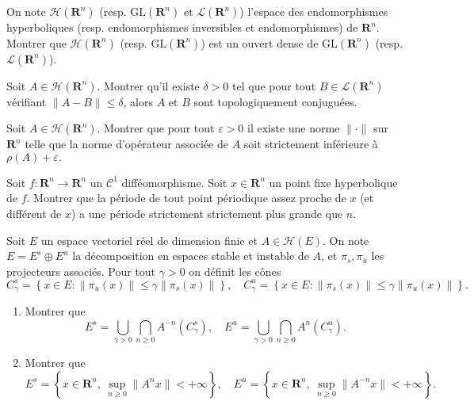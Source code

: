 \documentclass[a4paper,10pt,openany]{article}
\theoremstyle{plain}
\theoremstyle{definition}
\newcommand{\R}{\mathbf{R}}
\begin{document}
 \vspace{1.5mm} 

\noindent On note $\mathcal{H}(\R^n)$ (resp. $\mathrm{GL}(\R^n)$ et $\mathcal{L}(\R^n)$) l'espace des endomorphismes hyperboliques (resp. endomorphismes inversibles et endomorphismes) de $\R^n$. Montrer que $\mathcal{H}(\R^n)$ (resp. $\mathrm{GL}(\R^n)$) est un ouvert dense de $\mathrm{GL}(\R^n)$ (resp. $\mathcal{L}(\R^n)$).

\vspace{0.6cm}

 \vspace{1.5mm} 

\noindent Soit $A \in \mathcal{H}(\R^n)$. Montrer qu'il existe $\delta > 0$ tel que pour tout $B \in \mathcal{L}(\R^n)$ v\'erifiant $\|A-B\| \leq \delta$, alors $A$ et $B$ sont topologiquement conjugu\'ees.

\vspace{0.6cm}

 \vspace{1.5mm} 

\noindent Soit $A \in \mathcal{H}(\R^n)$. Montrer que pour tout $\varepsilon>0$ il existe une norme $\|\cdot\|$ sur $\R^n$ telle que la norme d'op\'erateur associ\'ee de $A$ soit strictement inf\'erieure \`a $\rho(A) + \varepsilon.$
\vspace{0.6cm}

 \vspace{1.5mm} 

\noindent Soit $f : \R^n \to \R^n$ un $\mathcal{C}^1$ diff\'eomorphisme. Soit $x \in \R^n$ un point fixe hyperbolique de $f$. Montrer que la p\'eriode de tout point p\'eriodique assez proche de $x$ (et diff\'erent de $x$) a une p\'eriode strictement strictement plus grande que $n$.
\vspace{0.6cm}

 \vspace{1.5mm} 

\noindent Soit $E$ un espace vectoriel r\'eel de dimension finie et $A \in \mathcal{H}(E)$. On note $E = E^s \oplus E^u$ la d\'ecomposition en espaces stable et instable de $A$, et $\pi_s, \pi_u$ les projecteurs associ\'es. Pour tout $\gamma > 0$ on d\'efinit les c\^ones
$$
C_{\gamma}^{s}=\left\{x \in E:\left\|\pi_{u}(x)\right\| \leq \gamma\left\|\pi_{s}(x)\right\|\right\}, \quad C_{\gamma}^{u}=\left\{x \in E:\left\|\pi_{s}(x)\right\| \leq \gamma\left\|\pi_{u}(x)\right\|\right\}.
$$
\begin{enumerate}
\item Montrer que 
$$
E^s = \bigcup_{\gamma > 0} \bigcap_{n \geq 0} A^{-n}(C^s_\gamma), \quad E^u = \bigcup_{\gamma > 0} \bigcap_{n \geq 0} A^{n}(C^u_\gamma).
$$
\item Montrer que 
$$
E^s = \left\{x \in \R^n,~\sup_{n \geqslant 0} \|A^nx\| < +\infty \right\}, \quad E^u = \left\{x \in \R^n,~ \sup_{n \geqslant 0} \|A^{-n}x\| < +\infty\right\}.
$$
\end{enumerate}
\vspace{0.6cm}
\end{document}
